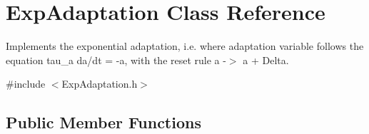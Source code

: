 \hypertarget{classExpAdaptation}{}\section{Exp\+Adaptation Class Reference}
\label{classExpAdaptation}


Implements the exponential adaptation, i.\+e. where adaptation variable follows the equation tau\+\_\+a da/dt = -\/a, with the reset rule a -\/$>$ a + Delta.  




{\ttfamily \#include $<$Exp\+Adaptation.\+h$>$}

\subsection*{Public Member Functions}
